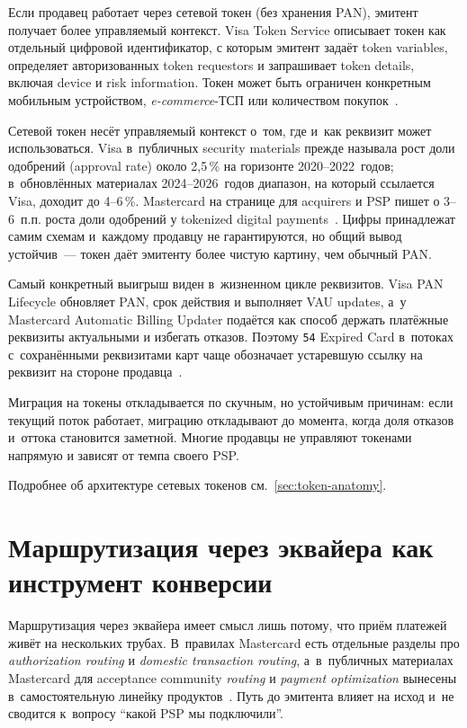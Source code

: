 Если продавец работает через сетевой токен (без хранения PAN),
эмитент получает более управляемый контекст. Visa Token Service
описывает токен как отдельный цифровой идентификатор, с
которым эмитент задаёт token variables, определяет авторизованных
token requestors и запрашивает token details, включая device и risk
information. Токен может быть
ограничен конкретным мобильным устройством, \textit{e-commerce}-ТСП или
количеством покупок~\cite{visa-vts,emvco-payment-tokenisation-guide}.

Сетевой токен несёт управляемый контекст о~том, где и~как реквизит
может использоваться. Visa в~публичных security materials
прежде называла рост доли одобрений (approval rate) около
2,5\,\% на горизонте 2020--2022~годов; в~обновлённых материалах
2024--2026~годов диапазон, на который ссылается Visa, доходит
до 4--6\,\%. Mastercard на странице для acquirers и PSP пишет
о 3--6~п.п. роста доли одобрений у tokenized digital
payments~\cite{visa-tokenization-security,mc-acquirers-psps}. Цифры
принадлежат самим схемам и~каждому продавцу не гарантируются, но
общий вывод устойчив~--- токен даёт эмитенту более чистую картину,
чем обычный PAN.

Самый конкретный выигрыш виден в~жизненном цикле реквизитов. Visa PAN
Lifecycle обновляет PAN, срок действия и выполняет VAU
updates, а~у Mastercard Automatic Billing Updater подаётся как способ
держать платёжные реквизиты актуальными и избегать отказов. Поэтому
\texttt{54} Expired Card в~потоках с~сохранёнными реквизитами карт
чаще обозначает устаревшую ссылку на реквизит на стороне
продавца~\cite{visa-vts,visa-vau,mc-bill-pay-solutions}.

Миграция на токены откладывается по скучным, но устойчивым причинам:
если текущий поток работает, миграцию откладывают до момента,
когда доля отказов и~оттока становится заметной. Многие продавцы не управляют токенами напрямую и зависят
от темпа своего PSP.

Подробнее об архитектуре сетевых токенов см.~\autoref{sec:token-anatomy}.

\section{Маршрутизация через эквайера как инструмент конверсии}\label{sec:decline-routing}

Маршрутизация через эквайера имеет смысл лишь потому, что приём
платежей живёт на нескольких трубах. В~правилах Mastercard есть
отдельные разделы про \textit{authorization routing} и \textit{domestic transaction
routing}, а~в~публичных материалах Mastercard для acceptance community
\textit{routing} и \textit{payment optimization} вынесены в~самостоятельную линейку
продуктов~\cite{mc-tpr,mc-acquirers-psps,mc-pop}.
Путь до эмитента влияет на исход и~не сводится к~вопросу
\enquote{какой PSP мы подключили}.

